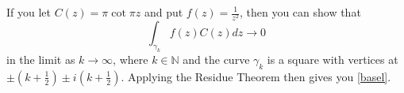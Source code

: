 \documentclass[manuscript,screen,nonacm]{acmart}
\begin{document}
If you let $C(z)=\pi\cot{\pi z}$ and put $f(z)=\frac{1}{z^2}$, then you can show that
\begin{equation}
	\int_{\gamma_k}f(z)C(z)dz \rightarrow 0
\end{equation}
in the limit as $k \rightarrow \infty$, where $k \in \mathbb{N}$ and the curve
$\gamma_k$ is a square with vertices at $\pm(k+\frac{1}{2})\pm
i(k+\frac{1}{2})$. Applying the Residue Theorem then gives you \eqref{basel}.
\end{document}
